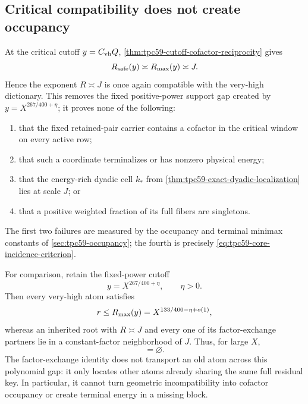 \subsection{Critical compatibility does not create occupancy}

At the critical cutoff \(y=C_{\rm vh}Q\),
\cref{thm:tpc59-cutoff-cofactor-reciprocity} gives
\begin{equation}
 R_{\rm safe}(y)\asymp R_{\rm max}(y)\asymp J.
 \label{eq:tpc59-critical-singleton-compatible-scale}
\end{equation}
Hence the exponent \(R\asymp J\) is once again compatible with the
very-high dictionary.  This removes the fixed positive-power support gap
created by \(y=X^{267/400+\eta}\); it proves none of the following:
\begin{enumerate}[label=\textup{(\roman*)},leftmargin=3em]
 \item that the fixed retained-pair carrier contains a cofactor in the
       critical window on every active row;
 \item that such a coordinate terminalizes or has nonzero physical energy;
 \item that the energy-rich dyadic cell \(k_*\) from
       \cref{thm:tpc59-exact-dyadic-localization} lies at scale \(J\); or
 \item that a positive weighted fraction of its full fibers are singletons.
\end{enumerate}
The first two failures are measured by the occupancy and terminal minimax
constants of \cref{sec:tpc59-occupancy}; the fourth is precisely
\eqref{eq:tpc59-core-incidence-criterion}.

For comparison, retain the fixed-power cutoff
\begin{equation}
 y=X^{267/400+\eta},
 \qquad \eta>0.
 \label{eq:tpc59-fixed-eta-singleton-face}
\end{equation}
Then every very-high atom satisfies
\begin{equation}
 r\le R_{\rm max}(y)
 =X^{133/400-\eta+o(1)},
 \label{eq:tpc59-fixed-eta-compatible-ceiling}
\end{equation}
whereas an inherited root with \(R\asymp J\) and every one of its
factor-exchange partners lie in a constant-factor neighborhood of \(J\).
Thus, for large \(X\),
\begin{equation}
 [R/2,4R)\cap[1,R_{\rm max}(y)]=\varnothing.
 \label{eq:tpc59-fixed-eta-factor-exchange-gap}
\end{equation}
The factor-exchange identity does not transport an old atom across this
polynomial gap: it only locates other atoms already sharing the same full
residual key.  In particular, it cannot turn geometric incompatibility
into cofactor occupancy or create terminal energy in a missing block.

